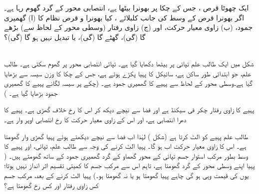  ایک چھوٹا قرص ، جس  کے  چکا پر    بھونرا  بیٹھا ہے، انتصابی محور کے گرد گھوم رہا ہے۔ اگر بھونرا  قرص کے وسط کی جانب  کلبلائے ،   کیا بھونرا و قرص نظام کا  (ا)    گھمیری جمود، (ب) زاوی معیار حرکت، اور (ج) زاوی رفتار   (وسطی محور کے لحاظ سے)  بڑھے گا (گی)، گھٹے گا (گی)، یا تبدیل نہیں ہو گا (گی)؟
 
 \\
 
 شکل  میں  ایک طالب علم تپائی پر بیٹھا  دکھایا گیا ہے۔ تپائی انتصابی محور پر گھوم سکتی ہے۔ طالب علم، جو ابتدائی طور ساکن ہے، سائیکل کا پہیا  پکڑے ہوئے ہے، جس کے چکا  کا وزن  سیسہ  سے بڑھایا گیا ہے۔وسطی محور کے لحاظ سے پہیے کا گھمیری جمود  ہے۔ (چکے پر سیسہ لگانے پہیے کا گھمیری جمود بڑھایا گیا ہے۔ )
 
 پہیے کا زاوی رفتار  چکر فی سیکنڈ ہے اور   فضا سے نیچے دیکھ کر اس کا رخ خلاف گھڑی ہے۔ پہیے کا دھرا انتصابی ہے، اور اس کے زاوی معیار حرکت  کا رخ انتصابی  اوپر  وار ہے۔
 
 طالب علم پہیے کو الٹ کرتا ہے (شکل ) لہٰذا اب فضا سے نیچے دیکھتے ہوئے پہیا گھڑی وار گھومتا ہے۔ اس کا زاوی معیار حرکت
  اب  ہو گا۔ پہیا الٹ کرنے کی وجہ سے طالب علم، تپائی، اور  پہیے  کا وسط بطور   مرکب استوار جسم  تپائی کے محور گھماو کے گرد گھمیری جمود  کے ساتھ گھومتے ہیں۔ (  پہیا  اپنے وسطی محور کے گرد گھومتا ہے،   تاہم اس سے مرکب جسم کا کمیتی تقسیم اثر انداز نہیں ہوتا؛ یوں  کی قیمت وہی ہو گی چاہے پہیا گھومتا ہو یا نہ گھومتا ہو۔) پہیا الٹ کرنے کے بعد، مرکب جسم کس زاوی رفتار  اور  کس رخ گھومتا ہے؟
  
